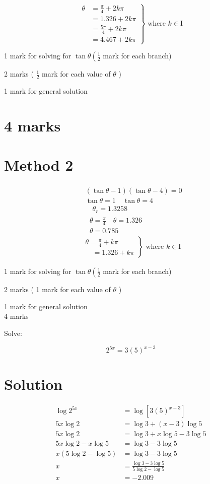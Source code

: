\documentclass[10pt]{article}
\begin{document}
$$
\left.\begin{array}{rl}
\theta & =\frac{\pi}{4}+2 k \pi \\
& =1.326+2 k \pi \\
& =\frac{5 \pi}{4}+2 k \pi \\
& =4.467+2 k \pi
\end{array}\right\} \text { where } k \in \mathrm{I}
$$

1 mark for solving for $\tan \theta\left(\frac{1}{2}\right.$ mark for each branch)

2 marks ( $\frac{1}{2}$ mark for each value of $\theta$ )

1 mark for general solution

\section*{4 marks}
\section*{Method 2}
$$
\begin{aligned}
& \begin{array}{l}
(\tan \theta-1)(\tan \theta-4)=0 \\
\tan \theta=1 \quad \tan \theta=4 \\
\quad \theta_{r}=1.3258
\end{array} \\
& \quad \theta=\frac{\pi}{4} \quad \theta=1.326 \\
& \quad \theta=0.785 \\
& \left.\begin{array}{r}
\theta=\frac{\pi}{4}+k \pi \\
\quad=1.326+k \pi
\end{array}\right\} \text { where } k \in \mathrm{I}
\end{aligned}
$$

1 mark for solving for $\tan \theta\left(\frac{1}{2}\right.$ mark for each branch)

2 marks ( 1 mark for each value of $\theta$ )

1 mark for general solution\\
4 marks

Solve:

$$
2^{5 x}=3(5)^{x-3}
$$

\section*{Solution}
$$
\begin{aligned}
\log 2^{5 x} & =\log \left[3(5)^{x-3}\right] \\
5 x \log 2 & =\log 3+(x-3) \log 5 \\
5 x \log 2 & =\log 3+x \log 5-3 \log 5 \\
5 x \log 2-x \log 5 & =\log 3-3 \log 5 \\
x(5 \log 2-\log 5) & =\log 3-3 \log 5 \\
x & =\frac{\log 3-3 \log 5}{5 \log 2-\log 5} \\
x & =-2.009
\end{aligned}
$$
\end{document}
